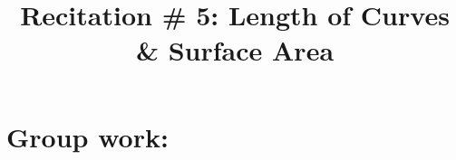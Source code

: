 \documentclass[noinstructornotes]{ximera}
\title{Recitation \# 5:  Length of Curves \& Surface Area}
\begin{document}
\begin{abstract}		\end{abstract}
\maketitle



\begin{comment}
\section{Warm up:}

	\begin{freeResponse}
	
	\end{freeResponse}
	
\begin{instructorNotes}

\end{instructorNotes}
\end{comment}







\section{Group work:}



\end{document}
